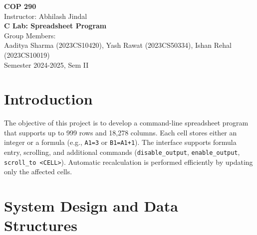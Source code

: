 \documentclass[10pt]{article}
\begin{document}
\begin{center}
    \Large \textbf{COP 290} \\
    \vspace{0.3cm}
    \large Instructor: Abhilash Jindal \\
    \vspace{0.3cm}
    \LARGE \textbf{C Lab: Spreadsheet Program} \\
    \vspace{0.3cm}
    \large Group Members: \\
    Aaditya Sharma (2023CS10420), Yash Rawat (2023CS50334), Ishan Rehal (2023CS10019) \\
    \vspace{0.3cm}
    Semester 2024-2025, Sem II
\end{center}

\vspace{0.5cm}

\begin{abstract}
This document provides a comprehensive overview of the design, implementation, and testing of a memory-optimized spreadsheet program in C. The program supports cell assignment, formula evaluation, and efficient recalculation through DFS-based cycle detection and topological sorting. We describe our design decisions—including memory optimizations and refined formula representation—and discuss edge cases and error scenarios covered by our test suite.
\end{abstract}

\section{Introduction}
The objective of this project is to develop a command-line spreadsheet program that supports up to 999 rows and 18,278 columns. Each cell stores either an integer or a formula (e.g., \texttt{A1=3} or \texttt{B1=A1+1}). The interface supports formula entry, scrolling, and additional commands (\texttt{disable\_output}, \texttt{enable\_output}, \texttt{scroll\_to <CELL>}). Automatic recalculation is performed efficiently by updating only the affected cells.

\section{System Design and Data Structures}
\end{document}
